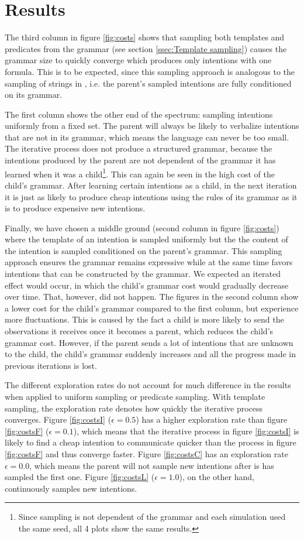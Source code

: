 \documentclass[a4paper]{article}
\begin{document}
\section{Results}
\label{sec:results}
The third column in figure \ref{fig:costs} shows that sampling both templates and predicates from the grammar (see section \ref{ssec:Template sampling}) causes the grammar size to quickly converge which produces only intentions with one formula. This is to be expected, since this sampling approach is analogous to the sampling of strings in \cite{zuidema2003poverty}, i.e. the parent's sampled intentions are fully conditioned on its grammar.

The first column shows the other end of the spectrum: sampling intentions uniformly from a fixed set. The parent will always be likely to verbalize intentions that are not in its grammar, which means the language can never be too small. The iterative process does not produce a structured grammar, because the intentions produced by the parent are not dependent of the grammar it has learned when it was a child\footnote{Since sampling is not dependent of the grammar and each simulation used the same seed, all 4 plots show the same results.}. This can again be seen in the high cost of the child's grammar. After learning certain intentions as a child, in the next iteration it is just as likely to produce cheap intentions using the rules of its grammar as it is to produce expensive new intentions.

Finally, we have chosen a middle ground (second column in figure \ref{fig:costs}) where the template of an intention is sampled uniformly but the the content of the intention is sampled conditioned on the parent's grammar. This sampling approach ensures the grammar remains expressive while at the same time favors intentions that can be constructed by the grammar. We expected an iterated effect would occur, in which the child's grammar cost would gradually decrease over time. That, however, did not happen. The figures in the second column show a lower cost for the child's grammar compared to the first column, but experience more fluctuations. This is caused by the fact a child is more likely to send the observations it receives once it becomes a parent, which reduces the child's grammar cost. However, if the parent sends a lot of intentions that are unknown to the child, the child's grammar suddenly increases and all the progress made in previous iterations is lost.

The different exploration rates do not account for much difference in the results when applied to uniform sampling or predicate sampling. With template sampling, the exploration rate denotes how quickly the iterative process converges. Figure \ref{fig:costsI} ($\epsilon = 0.5$) has a higher exploration rate than figure \ref{fig:costsF} ($\epsilon = 0.1$), which means that the iterative process in figure \ref{fig:costsI} is likely to find a cheap intention to communicate quicker than the process in figure \ref{fig:costsF} and thus converge faster. Figure \ref{fig:costsC} has an exploration rate $\epsilon = 0.0$, which means the parent will not sample new intentions after is has sampled the first one. Figure \ref{fig:costsL} ($\epsilon = 1.0$), on the other hand, continuously samples new intentions. 
\end{document}
